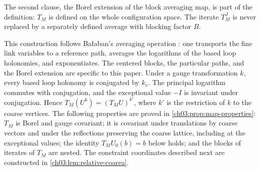 The second clause, the Borel extension of the block averaging map, is part of the definition: $T_M$ is defined on the whole configuration space. The iterate $T_M^J$ is never replaced by a separately defined average with blocking factor $B$.

This construction follows Bałaban's averaging operation \cite[(15), p.~19, and (42), p.~23]{Balaban1985Averaging}: one transports the fine link variables to a reference path, averages the logarithms of the based loop holonomies, and exponentiates. The centered blocks, the particular paths, and the Borel extension are specific to this paper. Under a gauge transformation $k$, every based loop holonomy is conjugated by $k_v$. The principal logarithm commutes with conjugation, and the exceptional value $-I$ is invariant under conjugation. Hence $T_M(U^k)=(T_MU)^{k'}$, where $k'$ is the restriction of $k$ to the coarse vertices. The following properties are proved in \cref{ch03:prop:map-properties}: $T_M$ is Borel and gauge covariant; it is covariant under translations by coarse vectors and under the reflections preserving the coarse lattice, including at the exceptional values; the identity $T_MU_0(b)=b$ below holds; and the blocks of iterates of $T_M$ are nested. The constraint coordinates described next are constructed in \cref{ch03:lem:relative-coarea}.

